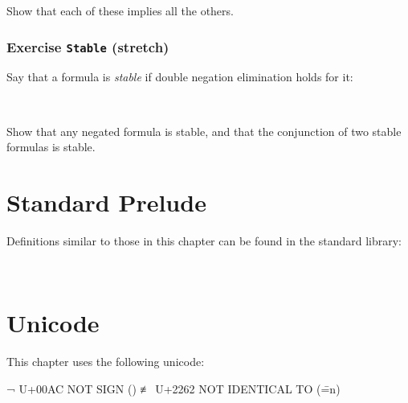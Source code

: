 Show that each of these implies all the others.

\begin{fence}
\begin{code}%
\>[0]\<%
\end{code}
\end{fence}

\hypertarget{exercise-stable-stretch}{%
\subsubsection{\texorpdfstring{Exercise \texttt{Stable}
(stretch)}{Exercise Stable (stretch)}}\label{exercise-stable-stretch}}

Say that a formula is \emph{stable} if double negation elimination holds
for it:

\begin{fence}
\begin{code}%
\>[0]\AgdaSpace{}%
\AgdaSymbol{:}\AgdaSpace{}%
\AgdaSpace{}%
\AgdaSpace{}%
\<%
\\
\>[0]\AgdaSpace{}%
\AgdaSpace{}%
\AgdaSymbol{=}\AgdaSpace{}%
\AgdaSpace{}%
\AgdaSpace{}%
\AgdaSpace{}%
\AgdaSpace{}%
\<%
\end{code}
\end{fence}

Show that any negated formula is stable, and that the conjunction of two
stable formulas is stable.

\begin{fence}
\begin{code}%
\>[0]\<%
\end{code}
\end{fence}

\hypertarget{standard-prelude}{%
\section{Standard Prelude}\label{standard-prelude}}

Definitions similar to those in this chapter can be found in the
standard library:

\begin{fence}
\begin{code}%
\>[0]\AgdaSpace{}%
\AgdaSpace{}%
\AgdaSpace{}%
\AgdaSymbol{(}\AgdaSymbol{)}\<%
\\
\>[0]\AgdaSpace{}%
\AgdaSpace{}%
\AgdaSpace{}%
\AgdaSymbol{(}\AgdaSymbol{)}\<%
\end{code}
\end{fence}

\hypertarget{unicode}{%
\section{Unicode}\label{unicode}}

This chapter uses the following unicode:

\begin{myDisplay}
¬  U+00AC  NOT SIGN (\neg)
≢  U+2262  NOT IDENTICAL TO (\==n)
\end{myDisplay}

